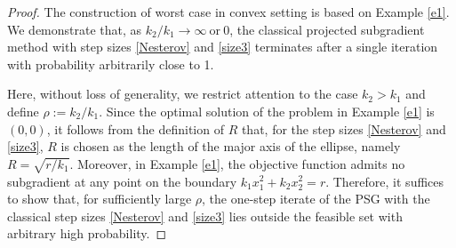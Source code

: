 \documentclass[sn-mathphys]{JORSC-jnl}%
\theoremstyle{thmstyleone}%
\theoremstyle{thmstylethree}%
\begin{document}
\begin{proof}
	The construction of worst case in convex setting is based on Example \ref{e1}. We demonstrate that, as $k_2/k_1 \to \infty ~\text{or}~ 0$, the classical projected subgradient method with step sizes \eqref{Nesterov} and \eqref{size3} terminates after a single iteration with probability arbitrarily close to 1.
	
	Here, without loss of generality, we restrict attention to the case $k_2 > k_1$ and define $\rho := k_2 / k_1$. Since the optimal solution of the problem in Example \ref{e1} is $(0,0)$, it follows from the definition of $R$ that, for the step sizes \eqref{Nesterov} and \eqref{size3}, $R$ is chosen as the length of the major axis of the ellipse, namely $R = \sqrt{r/k_1}$. Moreover, in Example \ref{e1}, the objective function admits no subgradient at any point on the boundary $k_1 x_1^2 + k_2 x_2^2 = r$. Therefore, it suffices to show that, for sufficiently large $\rho$, the one-step iterate of the PSG with the classical step sizes \eqref{Nesterov} and \eqref{size3} lies outside the feasible set with arbitrary high probability.
	

\end{proof}
\end{document}
